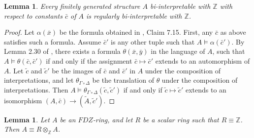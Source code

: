 \documentclass{article}
\newtheorem{lemma}[theorem]{Lemma}
\theoremstyle{remark}
\def\Z{{\mathbb{Z}}}
\begin{document}
\begin{lemma}\label{lem:regular-biint} Every finitely generated structure $A$ bi-interpretable with $\Z$ with respect to constants $\bar{c}$ of $A$ is regularly bi-interpretable with $\Z$.\end{lemma}
\begin{proof} Let $\alpha(\bar{x})$ be the formula obtained in \cite{Nies2007}, Claim 7.15. First, any $\bar{c}$ as above satisfies such a formula. Assume $\bar{c}'$ is any other tuple such that $A\models \alpha(\bar{c}')$. By Lemma 2.30 of \cite{AKNS}, there exists a formula $\theta(\bar{x},\bar{y})$ in the language of $A$, such that $A\models \theta(\bar{c}, \bar{c}')$ if and only if the assignment $\bar{c}\mapsto \bar{c}'$ extends to an automorphism of $A$. Let $\tilde{c}$ and $\tilde{c}'$ be the images of $\bar{c}$ and $\bar{c}'$ in $A$ under the composition of interpretations, and let $\theta_{\Gamma\circ\Delta}$ be the translation of $\theta$ under the composition of interpretations. Then $A\models \theta_{\Gamma\circ\Delta}(\tilde{c},\tilde{c}')$ if and only if $\tilde{c}\mapsto \tilde{c}'$ extends to an isomorphism $(A,\bar{c})\to (\tilde{A},\tilde{c}')$.\end{proof}

\begin{lemma}\label{lem:commutative-Mod} Let $A$ be an $FDZ$-ring, and let $R$ be a scalar ring such that $R\equiv \Z$. Then $A\equiv R\otimes_\Z A$. \end{lemma}  
\end{document}
